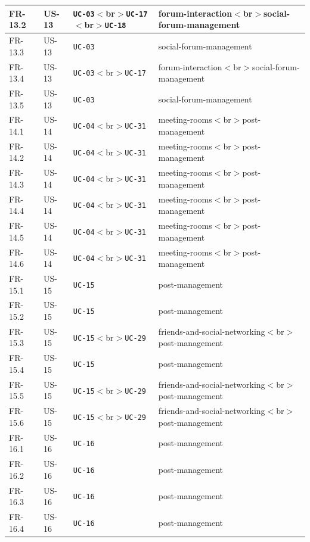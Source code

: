 \documentclass[12pt]{article}
\begin{document}
\begin{longtable}{|>{\raggedright\arraybackslash}p{}|>{\raggedright\arraybackslash}p{}|>{\raggedright\arraybackslash}p{}|>{\raggedright\arraybackslash}p{}|}
FR-13.2 & US-13 & \texttt{UC-03}$<$br$>$\texttt{UC-17}$<$br$>$\texttt{UC-18} & forum-interaction$<$br$>$social-forum-management \\ \hline
FR-13.3 & US-13 & \texttt{UC-03} & social-forum-management \\ \hline
FR-13.4 & US-13 & \texttt{UC-03}$<$br$>$\texttt{UC-17} & forum-interaction$<$br$>$social-forum-management \\ \hline
FR-13.5 & US-13 & \texttt{UC-03} & social-forum-management \\ \hline
FR-14.1 & US-14 & \texttt{UC-04}$<$br$>$\texttt{UC-31} & meeting-rooms$<$br$>$post-management \\ \hline
FR-14.2 & US-14 & \texttt{UC-04}$<$br$>$\texttt{UC-31} & meeting-rooms$<$br$>$post-management \\ \hline
FR-14.3 & US-14 & \texttt{UC-04}$<$br$>$\texttt{UC-31} & meeting-rooms$<$br$>$post-management \\ \hline
FR-14.4 & US-14 & \texttt{UC-04}$<$br$>$\texttt{UC-31} & meeting-rooms$<$br$>$post-management \\ \hline
FR-14.5 & US-14 & \texttt{UC-04}$<$br$>$\texttt{UC-31} & meeting-rooms$<$br$>$post-management \\ \hline
FR-14.6 & US-14 & \texttt{UC-04}$<$br$>$\texttt{UC-31} & meeting-rooms$<$br$>$post-management \\ \hline
FR-15.1 & US-15 & \texttt{UC-15} & post-management \\ \hline
FR-15.2 & US-15 & \texttt{UC-15} & post-management \\ \hline
FR-15.3 & US-15 & \texttt{UC-15}$<$br$>$\texttt{UC-29} & friends-and-social-networking$<$br$>$post-management \\ \hline
FR-15.4 & US-15 & \texttt{UC-15} & post-management \\ \hline
FR-15.5 & US-15 & \texttt{UC-15}$<$br$>$\texttt{UC-29} & friends-and-social-networking$<$br$>$post-management \\ \hline
FR-15.6 & US-15 & \texttt{UC-15}$<$br$>$\texttt{UC-29} & friends-and-social-networking$<$br$>$post-management \\ \hline
FR-16.1 & US-16 & \texttt{UC-16} & post-management \\ \hline
FR-16.2 & US-16 & \texttt{UC-16} & post-management \\ \hline
FR-16.3 & US-16 & \texttt{UC-16} & post-management \\ \hline
FR-16.4 & US-16 & \texttt{UC-16} & post-management \\ \hline

\end{longtable}
\end{document}
